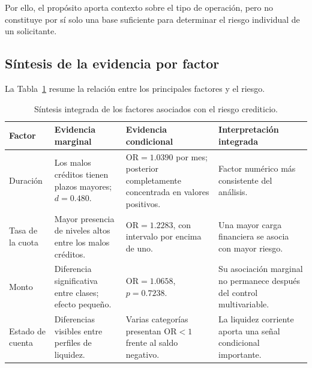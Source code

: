 Por ello, el propósito aporta contexto sobre el tipo de operación, pero
no constituye por sí solo una base suficiente para determinar el riesgo
individual de un solicitante.

\subsection{Síntesis de la evidencia por factor}

La Tabla~\ref{tab:evidencia-integrada-factores} resume la relación entre
los principales factores y el riesgo.

\begin{table}[H]
    \centering
    \caption{Síntesis integrada de los factores asociados con el riesgo
    crediticio.}
    \label{tab:evidencia-integrada-factores}

    \small
    \begin{tabularx}{\textwidth}{
        @{}
        >{\raggedright\arraybackslash}p{2.7cm}
        >{\raggedright\arraybackslash}p{4.1cm}
        >{\raggedright\arraybackslash}p{4.0cm}
        X
        @{}
    }
        \toprule
        Factor
        & Evidencia marginal
        & Evidencia condicional
        & Interpretación integrada \\
        \midrule

        Duración
        & Los malos créditos tienen plazos mayores; \(d=0.480\).
        & \(\mathrm{OR}=1.0390\) por mes; posterior completamente
          concentrada en valores positivos.
        & Factor numérico más consistente del análisis. \\

        Tasa de la cuota
        & Mayor presencia de niveles altos entre los malos créditos.
        & \(\mathrm{OR}=1.2283\), con intervalo por encima de uno.
        & Una mayor carga financiera se asocia con mayor riesgo. \\

        Monto
        & Diferencia significativa entre clases; efecto pequeño.
        & \(\mathrm{OR}=1.0658\), \(p=0.7238\).
        & Su asociación marginal no permanece después del control
          multivariable. \\

        Estado de cuenta
        & Diferencias visibles entre perfiles de liquidez.
        & Varias categorías presentan \(\mathrm{OR}<1\) frente al saldo
          negativo.
        & La liquidez corriente aporta una señal condicional importante. \\


\end{tabularx}
\end{table}
